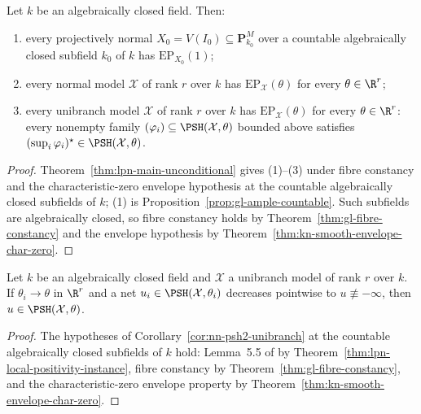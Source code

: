 \begin{theorem}
\label{thm:fu-model-main}
\leanok
Let $k$ be an algebraically closed field. Then:
\begin{enumerate}
\item every projectively normal $X_0=V(I_0)\subseteq\mathbf P^M_{k_0}$ over a
countable algebraically closed subfield $k_0$ of $k$ has
$\mathrm{EP}_{X_0}(1)$;
\item every normal model $\mathcal X$ of rank $r$ over $k$ has
$\mathrm{EP}_{\mathcal X}(\theta)$ for every $\theta\in\R^r$;
\item every unibranch model $\mathcal X$ of rank $r$ over $k$ has
$\mathrm{EP}_{\mathcal X}(\theta)$ for every $\theta\in\R^r$: every nonempty
family $(\varphi_i)\subseteq\PSH(\mathcal X,\theta)$ bounded above satisfies
$(\sup_i\varphi_i)^\star\in\PSH(\mathcal X,\theta)$.
\end{enumerate}
\end{theorem}
\begin{proof}
Theorem~\ref{thm:lpn-main-unconditional} gives (1)--(3) under fibre constancy
and the characteristic-zero envelope hypothesis at the countable algebraically
closed subfields of $k$; (1) is Proposition~\ref{prop:gl-ample-countable}. Such
subfields are algebraically closed, so fibre constancy holds by
Theorem~\ref{thm:gl-fibre-constancy} and the envelope hypothesis by
Theorem~\ref{thm:kn-smooth-envelope-char-zero}.
\end{proof}

\begin{corollary}
\label{cor:fu-model-psh2-unibranch}
\leanok
Let $k$ be an algebraically closed field and $\mathcal X$ a unibranch model of
rank $r$ over $k$. If $\theta_i\to\theta$ in $\R^r$ and a net
$u_i\in\PSH(\mathcal X,\theta_i)$ decreases pointwise to
$u\not\equiv-\infty$, then $u\in\PSH(\mathcal X,\theta)$.
\end{corollary}
\begin{proof}
The hypotheses of Corollary~\ref{cor:nn-psh2-unibranch} at the countable
algebraically closed subfields of $k$ hold: Lemma~5.5 of \cite{FHX} by
Theorem~\ref{thm:lpn-local-positivity-instance}, fibre constancy by
Theorem~\ref{thm:gl-fibre-constancy}, and the characteristic-zero envelope
property by Theorem~\ref{thm:kn-smooth-envelope-char-zero}.
\end{proof}

